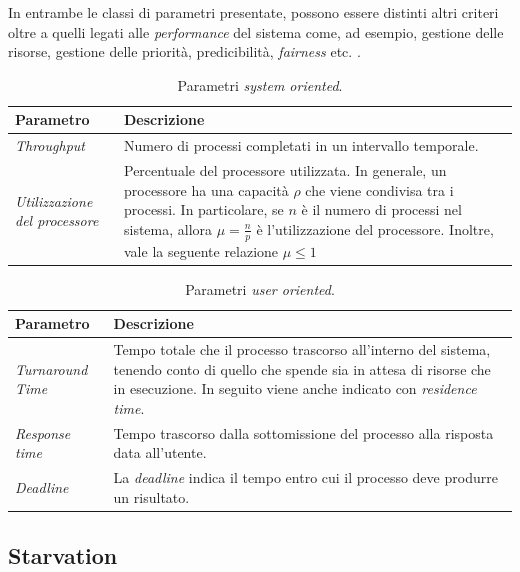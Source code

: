 In entrambe le classi di parametri presentate, possono essere distinti altri criteri oltre a quelli legati alle \textit{performance} del sistema come, ad esempio, gestione delle risorse, gestione delle priorità, predicibilità, \textit{fairness} etc. \cite{stallingsos}.

\begin{table}[h]
    \centering
    \begin{tabular}{|p{2.5cm}||p{9cm}| }
        \hline
        Parametro & Descrizione \\ [0.5ex] 
         \hline\hline
         \hline
         \textit{Throughput}& Numero di processi completati in un intervallo temporale.\\
         \hline 
         \hline
         \textit{Utilizzazione del processore}& Percentuale del processore utilizzata. In generale, un processore ha una capacità $\rho$ che viene condivisa tra i processi. In particolare, se $n$ è il numero di processi nel sistema, allora $\mu=\frac{n}{p}$ è l'utilizzazione del processore. Inoltre, vale la seguente relazione $\mu \leq 1$ \\
         \hline
    \end{tabular}
    \caption{Parametri \textit{system oriented}.}
    \label{tab:sys_oriented}
\end{table}

\begin{table}
    \centering
    \begin{tabular}{|p{2.5cm}||p{9cm}| }
        \hline
        Parametro & Descrizione \\ [0.5ex] 
         \hline\hline
         \hline
         \textit{Turnaround Time}& Tempo totale che il processo trascorso all'interno del sistema, tenendo conto di quello che spende sia in attesa di risorse che in esecuzione. In seguito viene anche indicato con \textit{residence time}.\\
         \hline 
         \hline
         \textit{Response time}& Tempo trascorso dalla sottomissione del processo alla risposta data all'utente.\\
         \hline
         \hline
         \textit{Deadline}& La \textit{deadline} indica il tempo entro cui il processo deve produrre un risultato.\\
         \hline
    \end{tabular}
    \caption{Parametri \textit{user oriented}.}
    \label{tab:user_oriented}
\end{table}

\subsection{Starvation}

